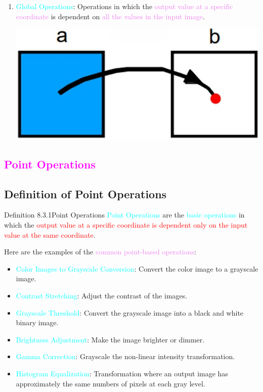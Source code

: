 \documentclass{book}
\begin{document}
\begin{enumerate}
\begin{center}
    \end{center}
    \item \textcolor{cyan}{Global Operations}: Operations in which the \textcolor{violet}{output value at a specific coordinate} is dependent on \textcolor{violet}{all the values in the input image}.
    \begin{center}
        \includegraphics[scale=0.3]{chapter 8/ch8_figure7.jpeg}
    \end{center}
\end{enumerate}
\newpage
\textcolor{magenta}{\section{\textbf{Point Operations}}}
\subsection{Definition of Point Operations}
\begin{defBox}{Definition 8.3.1}{Point Operations}
    \textcolor{cyan}{Point Operations} are the \textcolor{cyan}{basic operations} in which the \textcolor{red}{output value at a specific coordinate is dependent only on the input value at the same coordinate}.
\end{defBox}
Here are the examples of the \textcolor{violet}{common point-based operations}:
\begin{itemize}
    \item \textcolor{cyan}{Color Images to Grayscale Conversion}: Convert the color image to a grayscale image.
    \item \textcolor{cyan}{Contrast Stretching}: Adjust the contrast of the images.
    \item \textcolor{cyan}{Grayscale Threshold}: Convert the grayscale image into a black and white binary image.
    \item \textcolor{cyan}{Brightness Adjustment}: Make the image brighter or dimmer.
    \item \textcolor{cyan}{Gamma Correction}: Grayscale the non-linear intensity transformation.
    \item \textcolor{cyan}{Histogram Equalization}: Transformation where an output image has approximately the same numbers of pixels at each gray level.
\end{itemize}
\end{document}
